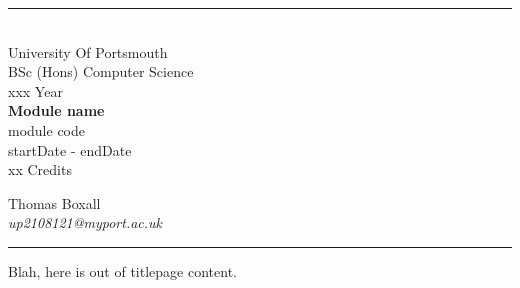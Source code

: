 \documentclass[a4paper, 11pt]{report}
\begin{document}
    \begin{titlepage}
        \rule{\textwidth}{1px}
        \vspace{0.025\textheight}\\
        \huge{University Of Portsmouth}\\
        \huge{BSc (Hons) Computer Science}\\
        \huge{xxx Year}\\
        \vfill
        \LARGE{\textbf{Module name}}\\
        \Large{module code}\\
        \large{startDate - endDate}\\
        \large{xx Credits}
        \vfill

        
        \begin{FlushRight}
            \large{Thomas Boxall}\\
            \textit{up2108121@myport.ac.uk}\\
            
        \end{FlushRight}
        \vspace{0.2\textheight}
        \rule{\textwidth}{1px}
        
    \end{titlepage}
    Blah, here is out of titlepage content.
\end{document}
